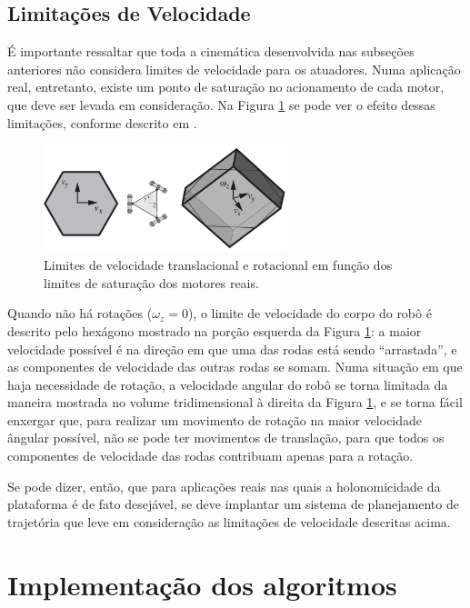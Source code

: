 \subsection{Limitações de Velocidade}

É importante ressaltar que toda a cinemática desenvolvida nas subseções anteriores não considera limites de velocidade para os atuadores. Numa aplicação real, entretanto, existe um ponto de saturação no acionamento de cada motor, que deve ser levada em consideração. Na Figura \ref{fig:twist_sat} se pode ver o efeito dessas limitações, conforme descrito em \cite{lynch2017modern}.

\begin{figure}[h]
  \centering
  \includegraphics[width = 0.63\textwidth]{imagens/twist_sat}
  \caption{Limites de velocidade translacional e rotacional em função dos limites de saturação dos motores reais.}
  \label{fig:twist_sat}
\end{figure}

Quando não há rotações ($\omega_z = 0$), o limite de velocidade do corpo do robô é descrito pelo hexágono mostrado na porção esquerda da Figura \ref{fig:twist_sat}: a maior velocidade possível é na direção em que uma das rodas está sendo ``arrastada'', e as componentes de velocidade das outras rodas se somam. Numa situação em que haja necessidade de rotação, a velocidade angular do robô se torna limitada da maneira mostrada no volume tridimensional à direita da Figura \ref{fig:twist_sat}, e se torna fácil enxergar que, para realizar um movimento de rotação na maior velocidade ângular possível, não se pode ter movimentos de translação, para que todos os componentes de velocidade das rodas contribuam apenas para a rotação.

Se pode dizer, então, que para aplicações reais nas quais a holonomicidade da plataforma é de fato desejável, se deve implantar um sistema de planejamento de trajetória que leve em consideração as limitações de velocidade descritas acima.

\section{Implementação dos algoritmos}
\label{sec:software}

